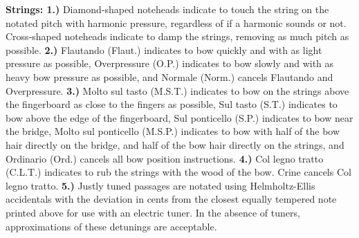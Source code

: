 \documentclass[11pt]{article}
\begin{document}
\begingroup
\begin{center}
\textbf{Strings: 1.)} Diamond-shaped noteheads indicate to touch the string on the notated pitch with harmonic pressure, regardless of if a harmonic sounds or not. Cross-shaped noteheads indicate to damp the strings, removing as much pitch as possible. \textbf{2.)} Flautando (Flaut.) indicates to bow quickly and with as light pressure as possible, Overpressure (O.P.) indicates to bow slowly and with as heavy bow pressure as possible, and Normale (Norm.) cancels Flautando and Overpressure. \textbf{3.)} Molto sul tasto (M.S.T.) indicates to bow on the strings above the fingerboard as close to the fingers as possible, Sul tasto (S.T.) indicates to bow above the edge of the fingerboard, Sul ponticello (S.P.) indicates to bow near the bridge, Molto sul ponticello (M.S.P.) indicates to bow with half of the bow hair directly on the bridge, and half of the bow hair directly on the strings, and Ordinario (Ord.) cancels all bow position instructions. \textbf{4.)} Col legno tratto (C.L.T.) indicates to rub the strings with the wood of the bow. Crine cancels Col legno tratto. \textbf{5.)} Justly tuned passages are notated using Helmholtz-Ellis accidentals with the deviation in cents from the closest equally tempered note printed above for use with an electric tuner. In the absence of tuners, approximations of these detunings are acceptable. \\
\rightskip\leftskip
\end{center}
\endgroup
\end{document}
